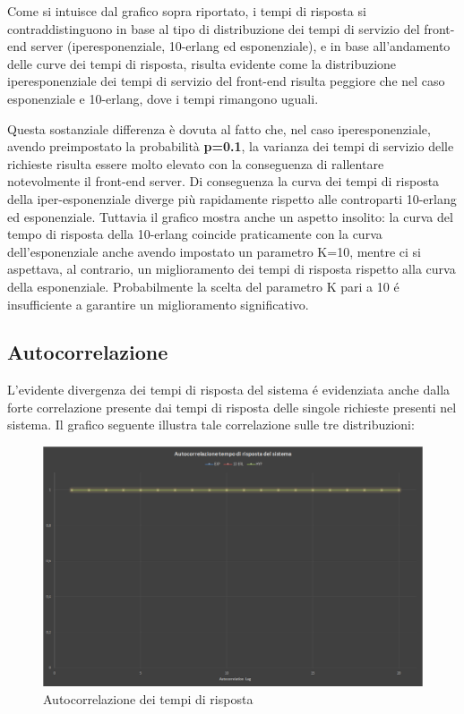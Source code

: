 Come si intuisce dal grafico sopra riportato, i tempi di risposta si 
contraddistinguono in base
al tipo di distribuzione dei tempi di servizio del front-end server 
(iperesponenziale, 10-erlang 
ed esponenziale), e in base all'andamento delle curve dei tempi di risposta, 
risulta evidente 
come la distribuzione iperesponenziale dei tempi di servizio del front-end 
risulta peggiore 
che nel caso esponenziale e 10-erlang, dove i tempi rimangono uguali.

Questa sostanziale differenza \`e dovuta al fatto che, nel caso 
iperesponenziale, avendo 
preimpostato la probabilità \textbf{p=0.1}, la varianza dei tempi di servizio 
delle richieste risulta 
essere molto elevato con la conseguenza di rallentare notevolmente il front-end 
server.
Di conseguenza la curva dei tempi di risposta della iper-esponenziale diverge 
pi\`u 
rapidamente rispetto alle controparti 10-erlang ed esponenziale. Tuttavia il 
grafico mostra 
anche un aspetto insolito: la curva del tempo di risposta della 10-erlang 
coincide 
praticamente con la curva dell'esponenziale anche avendo impostato un parametro 
K=10, 
mentre ci si aspettava, al contrario, un miglioramento dei tempi di risposta 
rispetto alla curva 
della esponenziale. Probabilmente la scelta del parametro K pari a 10 \'e 
insufficiente a 
garantire un miglioramento significativo.

\subsection{Autocorrelazione}

L'evidente divergenza dei tempi di risposta del sistema \'e evidenziata anche 
dalla forte 
correlazione presente dai tempi di risposta delle singole richieste presenti nel 
sistema. Il 
grafico seguente illustra tale correlazione sulle tre distribuzioni:

\begin{figure}[H]
 \centering
 \includegraphics[scale=0.45]{img/autocorrelation.png}
 \caption[Autocorrelazione dei tempi di risposta]{Autocorrelazione dei tempi di 
risposta}
 \label{fig:Autocorrelazione dei tempi di risposta}
\end{figure}

